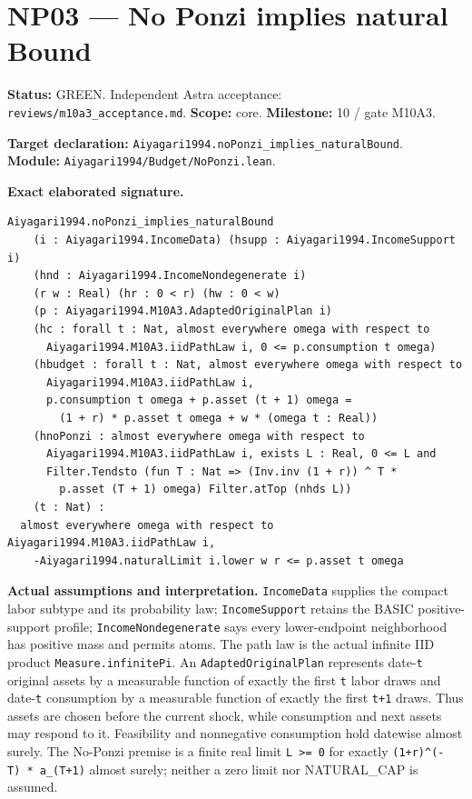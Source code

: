 \documentclass[
  11pt,
]{article}
\let\LedgerOriginalTexttt\texttt
\renewcommand{\texttt}[1]{{\small\LedgerOriginalTexttt{#1}}}
\begin{document}
\section{NP03 --- No Ponzi implies natural
Bound}\label{np03-no-ponzi-implies-natural-bound}

\textbf{Status:} GREEN. Independent Astra acceptance:
\texttt{reviews/m10a3\_acceptance.md}. \textbf{Scope:} core.
\textbf{Milestone:} 10 / gate M10A3.

\textbf{Target declaration:}
\texttt{Aiyagari1994.noPonzi\_implies\_naturalBound}.\\
\textbf{Module:} \texttt{Aiyagari1994/Budget/NoPonzi.lean}.

\textbf{Exact elaborated signature.}

\begin{verbatim}
Aiyagari1994.noPonzi_implies_naturalBound
    (i : Aiyagari1994.IncomeData) (hsupp : Aiyagari1994.IncomeSupport i)
    (hnd : Aiyagari1994.IncomeNondegenerate i)
    (r w : Real) (hr : 0 < r) (hw : 0 < w)
    (p : Aiyagari1994.M10A3.AdaptedOriginalPlan i)
    (hc : forall t : Nat, almost everywhere omega with respect to
      Aiyagari1994.M10A3.iidPathLaw i, 0 <= p.consumption t omega)
    (hbudget : forall t : Nat, almost everywhere omega with respect to
      Aiyagari1994.M10A3.iidPathLaw i,
      p.consumption t omega + p.asset (t + 1) omega =
        (1 + r) * p.asset t omega + w * (omega t : Real))
    (hnoPonzi : almost everywhere omega with respect to
      Aiyagari1994.M10A3.iidPathLaw i, exists L : Real, 0 <= L and
      Filter.Tendsto (fun T : Nat => (Inv.inv (1 + r)) ^ T *
        p.asset (T + 1) omega) Filter.atTop (nhds L))
    (t : Nat) :
  almost everywhere omega with respect to Aiyagari1994.M10A3.iidPathLaw i,
    -Aiyagari1994.naturalLimit i.lower w r <= p.asset t omega
\end{verbatim}

\textbf{Actual assumptions and interpretation.} \texttt{IncomeData}
supplies the compact labor subtype and its probability law;
\texttt{IncomeSupport} retains the BASIC positive-support profile;
\texttt{IncomeNondegenerate} says every lower-endpoint neighborhood has
positive mass and permits atoms. The path law is the actual infinite IID
product \texttt{Measure.infinitePi}. An \texttt{AdaptedOriginalPlan}
represents date-\texttt{t} original assets by a measurable function of
exactly the first \texttt{t} labor draws and date-\texttt{t} consumption
by a measurable function of exactly the first \texttt{t+1} draws. Thus
assets are chosen before the current shock, while consumption and next
assets may respond to it. Feasibility and nonnegative consumption hold
datewise almost surely. The No-Ponzi premise is a finite real limit
\texttt{L\ \textgreater{}=\ 0} for exactly
\texttt{(1+r)\^{}(-T)\ *\ a\_(T+1)} almost surely; neither a zero limit
nor NATURAL\_CAP is assumed.
\end{document}
